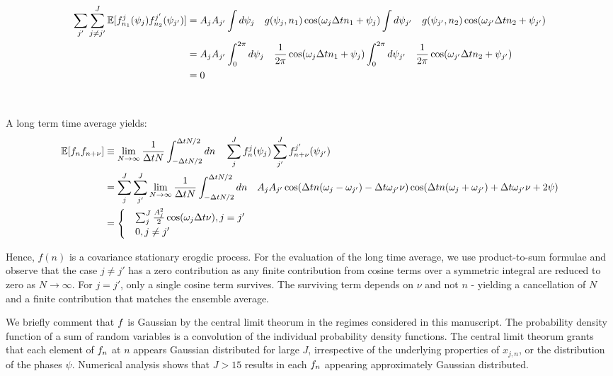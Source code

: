 \begin{align}
\sum_{j'}\sum_{j\neq j'}^J \mathbb{E}[f^j_{n_1}(\psi_j) f^{j'}_{n_2}(\psi_{j'})] & = A_j A_{j'} \int d \psi_j \quad g(\psi_j, n_1) \cos(\omega_j \Delta t n_1 + \psi_j) \int d \psi_{j'} \quad g(\psi_{j'}, n_2) \cos(\omega_{j'} \Delta t n_2 + \psi_{j'}) \\
& = A_j A_{j'} \int_0^{2\pi} d \psi_j \quad \frac{1}{2\pi} \cos(\omega_j \Delta t n_1 + \psi_j) \int_0^{2\pi} d \psi_{j'} \quad \frac{1}{2\pi}  \cos(\omega_{j'} \Delta t n_2 + \psi_{j'}) \\
& = 0 
\end{align}
 \\
 \\
  A long term time average yields:
\begin{align}
\mathbb{E}[f_n f_{n+\nu}] & \equiv \lim_{N \to \infty} \frac{1}{\Delta t N} \int_{-\Delta t N/2}^{\Delta t N/2} dn \quad  \sum_j^J f^j_n(\psi_j) \sum_{j'}^{J} f^{j'}_{n + \nu}(\psi_{j'}) \\
&= \sum_j^J  \sum_{j'}^{J} \lim_{N \to \infty} \frac{1}{\Delta t N} \int_{-\Delta t N/2}^{\Delta t N/2} dn \quad   A_j A_{j'} \cos (\Delta t n(\omega_j - \omega_{j'}) - \Delta t \omega_{j'} \nu)  \cos (\Delta t n(\omega_j + \omega_{j'}) + \Delta t \omega_{j'} \nu + 2\psi)\\
&= \begin{cases}
& \sum_j^J \frac{A_j^2}{2} \cos(\omega_j \Delta t \nu),  j = j' \\
& 0, j \neq j'
\end{cases}
\end{align}

Hence, $f(n)$ is a covariance stationary erogdic process. For the evaluation of the long time average, we use product-to-sum formulae and observe that the case $j\neq j'$ has a zero contribution as any finite contribution from cosine terms over a symmetric integral are reduced to zero as $N \rightarrow \infty $.  For $j = j'$, only a single cosine term survives. The surviving term depends on $\nu$ and not $n$ - yielding a cancellation of $N$ and a finite contribution that matches the ensemble average.

We briefly comment that $f$ is Gaussian by the central limit theorum in the regimes considered in this manuscript. The probability density function of a sum of random variables is a convolution of the individual probability density functions. The central limit theorum grants that each element of $f_n$ at $n$ appears Gaussian distributed for large $J$, irrespective of the underlying properties of $x_{j,n}$, or the distribution of the phases $\psi$. Numerical analysis shows that $J > 15$ results in each $f_n$ appearing approximately Gaussian distributed. 




